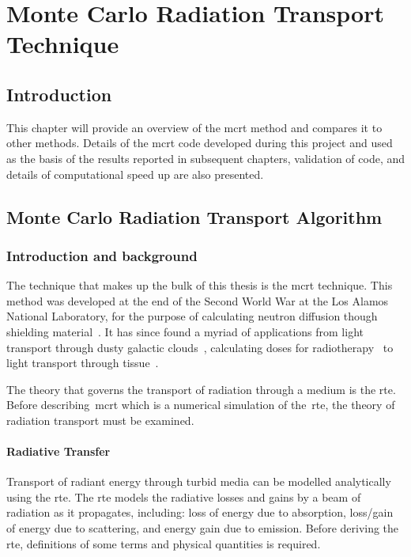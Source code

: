 \chapter{Monte Carlo Radiation Transport Technique}
\label{sec:mcrt}
\section{Introduction}
This chapter will provide an overview of the \gls*{mcrt} method and compares it to other methods. 
Details of the \gls*{mcrt} code developed during this project and used as the basis of the results reported in subsequent chapters, validation of code, and details of computational speed up are also presented.

\section{Monte Carlo Radiation Transport Algorithm}

\subsection{Introduction and background}
The technique that makes up the bulk of this thesis is the \gls*{mcrt} technique. This method was developed at the end of the Second World War at the Los Alamos National Laboratory, for the purpose of calculating neutron diffusion though shielding material~\cite{montybeg1,eckhardt1987stan,anderson1986metropolis,ulam1947statistical}. It has since found a myriad of applications from light transport through dusty galactic clouds~\cite{wood1999model}, calculating doses for radiotherapy~\cite{rogers1995beam} to light transport through tissue~\cite{1stmonty}.

The theory that governs the transport of radiation through a medium is the \gls*{rte}.
Before describing~\gls*{mcrt} which is a numerical simulation of the~\gls*{rte}, the theory of radiation transport must be examined.

\subsubsection*{Radiative Transfer}
Transport of radiant energy through turbid media can be modelled analytically using the \gls*{rte}. The \gls*{rte} models the radiative losses and gains by a beam of radiation as it propagates, including: loss of energy due to absorption, loss/gain of energy due to scattering, and energy gain due to emission. Before deriving the \gls*{rte}, definitions of some terms and physical quantities is required.


